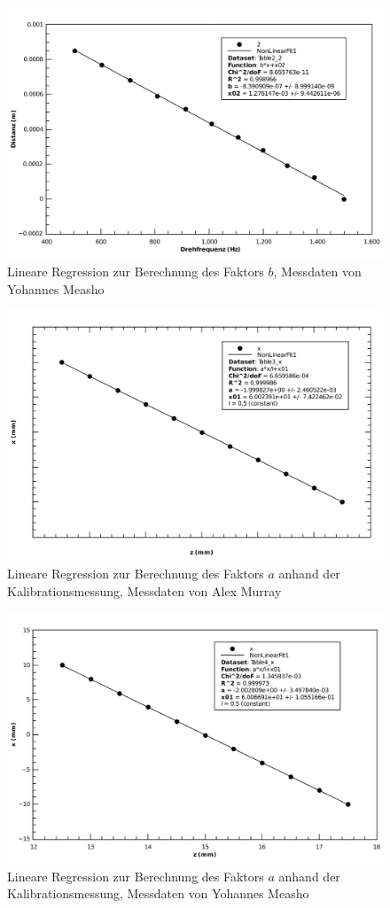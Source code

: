 \begin{figure}[H]
    \center
    \includegraphics[width=.8\textwidth]{images/ym-f-x-fit-b.pdf}
    \caption{Lineare Regression zur Berechnung des Faktors $b$, Messdaten von Yohannes Measho}
    \label{fig:ym-f-x-fit-b}
\end{figure}

\begin{figure}[H]
    \center
    \includegraphics[width=.8\textwidth]{images/am-x-z-fit-a.pdf}
    \caption{Lineare Regression zur Berechnung des Faktors $a$ anhand der Kalibrationsmessung, Messdaten von Alex Murray}
    \label{fig:am-x-z-fit-a}
\end{figure}

\begin{figure}[H]
    \center
    \includegraphics[width=.8\textwidth]{images/ym-x-z-fit-a.pdf}
    \caption{Lineare Regression zur Berechnung des Faktors $a$ anhand der Kalibrationsmessung, Messdaten von Yohannes Measho}
    \label{fig:ym-x-z-fit-a}
\end{figure}


